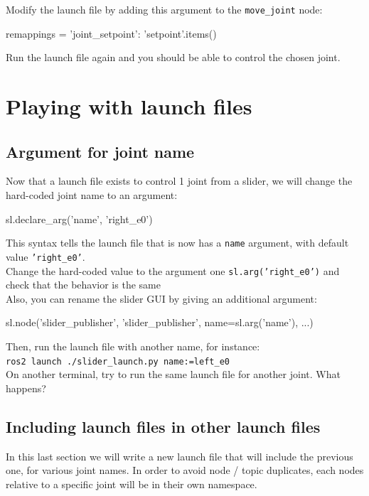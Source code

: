 \documentclass{ecnreport}
\begin{document}
Modify the launch file by adding this argument to the \texttt{move\_joint} node:

\begin{pythoncodelarge}
remappings = {'joint_setpoint': 'setpoint'}.items()
\end{pythoncodelarge}
Run the launch file again and you should be able to control the chosen joint.

\section{Playing with launch files}

\subsection{Argument for joint name}

Now that a launch file exists to control 1 joint from a slider, we will change the hard-coded joint name to an argument:
\begin{pythoncodelarge}
sl.declare_arg('name', 'right_e0')
\end{pythoncodelarge}
This syntax tells the launch file that is now has a \texttt{name} argument, with default value \texttt{'right\_e0'}.\\

Change the hard-coded value to the argument one \texttt{sl.arg('right\_e0')} and check that the behavior is the same\\

Also, you can rename the slider GUI by giving an additional argument:
\begin{pythoncodelarge}
sl.node('slider_publisher', 'slider_publisher', name=sl.arg('name'), ...)
\end{pythoncodelarge}

Then, run the launch file with another name, for instance:\\ \texttt{ros2 launch ./slider\_launch.py name:=left\_e0}\\
On another terminal, try to run the same launch file for another joint. What happens?\\



\subsection{Including launch files in other launch files}

In this last section we will write a new launch file that will include the previous one, for various joint names. In order to avoid node / topic duplicates, each nodes relative to a specific joint will be in their own namespace. 
\end{document}
